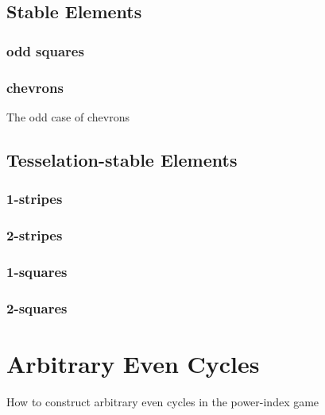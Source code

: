 \documentclass{article}
\theoremstyle{plain}
\theoremstyle{definition}
\begin{document}
		\subsection{Stable Elements}
			\subsubsection{odd squares}
			\subsubsection{chevrons}
				The odd case of chevrons
		\subsection{Tesselation-stable Elements}
			\subsubsection{1-stripes}
			\subsubsection{2-stripes}
			\subsubsection{1-squares}
			\subsubsection{2-squares}
	\section{Arbitrary Even Cycles}
		How to construct arbitrary even cycles in the power-index game
\end{document}
